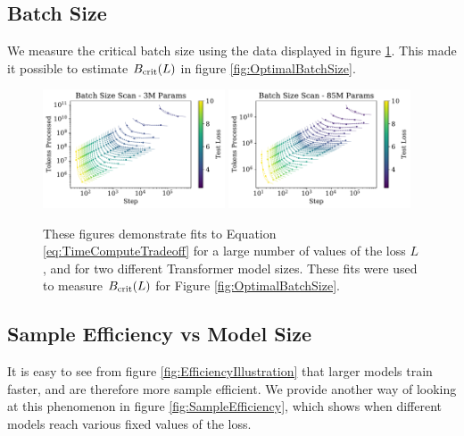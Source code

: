 \documentclass[english]{article}
\begin{document}
\subsection{Batch Size}

We measure the critical batch size using the data displayed in figure \ref{fig:BatchPareto}.  This made it possible to estimate $B_{\rm crit}(L)$ in figure \ref{fig:OptimalBatchSize}.

\begin{figure}
\noindent \centering{} 
\includegraphics[width=0.48\textwidth]{BatchParetoFronts3M} 
\includegraphics[width=0.48\textwidth]{BatchParetoFronts85M}
 \caption[Batch size scans]{These figures demonstrate fits to Equation \eqref{eq:TimeComputeTradeoff} for a large number of values of the loss $L$, and for two different Transformer model sizes.  These fits were used to measure $B_{\rm crit}(L)$ for Figure \ref{fig:OptimalBatchSize}.  \label{fig:BatchPareto}}
\end{figure}

\subsection{Sample Efficiency vs Model Size}

It is easy to see from figure \ref{fig:EfficiencyIllustration} that larger models train faster, and are therefore more sample efficient.  We provide another way of looking at this phenomenon in figure \ref{fig:SampleEfficiency}, which shows when different models reach various fixed values of the loss.
\end{document}
